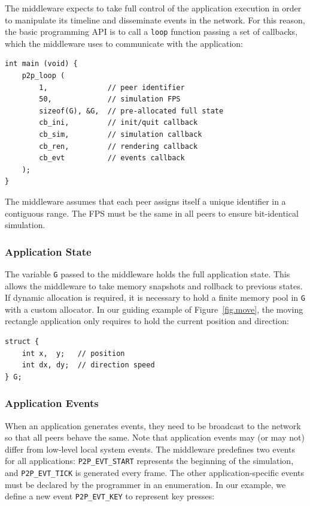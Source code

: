 \documentclass[fleqn,10pt]{SelfArx}
\newcommand{\code}[1]  {\texttt{\footnotesize{#1}}}
\begin{document}
The middleware expects to take full control of the application execution in
order to manipulate its timeline and disseminate events in the network.
For this reason, the basic programming API is to call a \code{loop} function
passing a set of callbacks, which the middleware uses to communicate with the
application:

{\footnotesize
\begin{verbatim}
int main (void) {
    p2p_loop (
        1,              // peer identifier
        50,             // simulation FPS
        sizeof(G), &G,  // pre-allocated full state
        cb_ini,         // init/quit callback
        cb_sim,         // simulation callback
        cb_ren,         // rendering callback
        cb_evt          // events callback
    );
}
\end{verbatim}
}

The middleware assumes that each peer assigns itself a unique identifier in a
contiguous range.
The FPS must be the same in all peers to ensure bit-identical simulation.

\subsubsection{Application State}
\label{sec.tml.api.state}

The variable \code{G} passed to the middleware holds the full application
state.
This allows the middleware to take memory snapshots and rollback to previous
states.
If dynamic allocation is required, it is necessary to hold a finite memory
pool in \code{G} with a custom allocator.
In our guiding example of Figure~\ref{fig.move}, the moving rectangle
application only requires to hold the current position and direction:

{\footnotesize
\begin{verbatim}
struct {
    int x,  y;   // position
    int dx, dy;  // direction speed
} G;
\end{verbatim}
}

\subsubsection{Application Events}
\label{sec.tml.api.events}

When an application generates events, they need to be broadcast to the network
so that all peers behave the same.
Note that application events may (or may not) differ from low-level local
system events.
%
The middleware predefines two events for all applications:
    \code{P2P\_EVT\_START} represents the beginning of the simulation, and
    \code{P2P\_EVT\_TICK} is generated every frame.
The other application-specific events must be declared by the programmer in an
enumeration.
In our example, we define a new event \code{P2P\_EVT\_KEY} to represent key
presses:
\end{document}
